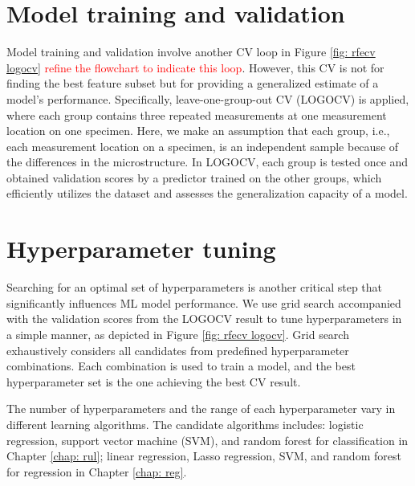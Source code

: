 \section{Model training and validation}
\label{sec: model train and val}
Model training and validation involve another CV loop in Figure \ref{fig: rfecv logocv} \textcolor{red}{refine the flowchart to indicate this loop}. However, this CV is not for finding the best feature subset but for providing a generalized estimate of a model's performance. Specifically, leave-one-group-out CV (LOGOCV) is applied, where each group contains three repeated measurements at one measurement location on one specimen. Here, we make an assumption that each group, i.e., each measurement location on a specimen, is an independent sample because of the differences in the microstructure. In LOGOCV, each group is tested once and obtained validation scores by a predictor trained on the other groups, which efficiently utilizes the dataset and assesses the generalization capacity of a model.

\section{Hyperparameter tuning}
Searching for an optimal set of hyperparameters is another critical step that significantly influences ML model performance. We use grid search accompanied with the validation scores from the LOGOCV result to tune hyperparameters in a simple manner, as depicted in Figure \ref{fig: rfecv logocv}. Grid search exhaustively considers all candidates from predefined hyperparameter combinations. Each combination is used to train a model, and the best hyperparameter set is the one achieving the best CV result. 

The number of hyperparameters and the range of each hyperparameter vary in different learning algorithms. The candidate algorithms includes: logistic regression, support vector machine (SVM), and random forest for classification in Chapter \ref{chap: rul}; linear regression, Lasso regression, SVM, and random forest for regression in Chapter \ref{chap: reg}.